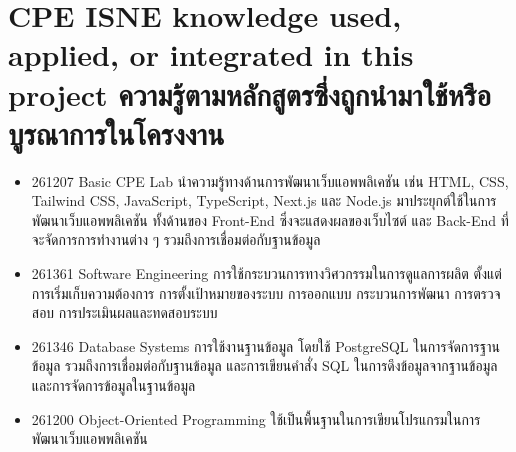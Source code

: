 \section{\ifenglish%
      \ifcpe CPE \else ISNE \fi knowledge used, applied, or integrated in this project
  \else%
      ความรู้ตามหลักสูตรซึ่งถูกนำมาใช้หรือบูรณาการในโครงงาน
  \fi
 }

\begin{itemize}
    \item 261207 Basic CPE Lab นําความรู้ทางด้านการพัฒนาเว็บแอพพลิเคชัน เช่น HTML, CSS, Tailwind CSS, JavaScript, TypeScript, Next.js
          และ Node.js มาประยุกต์ใช้ในการพัฒนาเว็บแอพพลิเคชัน ทั้งด้านของ Front-End ซึ่งจะแสดงผลของเว็บไซต์ และ Back-End ที่จะจัดการการทำงานต่าง ๆ รวมถึงการเชื่อมต่อกับฐานข้อมูล
    \item 261361 Software Engineering การใช้กระบวนการทางวิศวกรรมในการดูแลการผลิต ตั้งแต่การเริ่มเก็บความต้องการ การตั้งเป้าหมายของระบบ การออกแบบ กระบวนการพัฒนา การตรวจสอบ การประเมินผลและทดสอบระบบ
    \item 261346 Database Systems การใช้งานฐานข้อมูล โดยใช้ PostgreSQL ในการจัดการฐานข้อมูล รวมถึงการเชื่อมต่อกับฐานข้อมูล
          และการเขียนคำสั่ง SQL ในการดึงข้อมูลจากฐานข้อมูลและการจัดการข้อมูลในฐานข้อมูล

    \item 261200 Object-Oriented Programming ใช้เป็นพื้นฐานในการเขียนโปรแกรมในการพัฒนาเว็บแอพพลิเคชัน 
\end{itemize}



